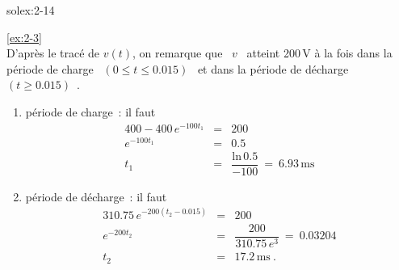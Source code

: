 \begin{exwithsol}{solex:2-14}
\begin{solexercise}{\ref{ex:2-3}}
\\
D'apr\`es le trac\'e de $ v(t)$, on remarque que \ $v$ \
atteint 200$\,$V \`a la fois dans la p\'eriode de charge \ $(0 \leq t \leq
0.015)$ \ et dans la p\'eriode de d\'echarge \ $(t \geq 0.015)$~.

\begin{enumerate}
	\item p\'eriode de charge~: il faut
	\begin{eqnarray*}
		400 - 400\, e^{-100t_1} &=& 200\\
		e^{-100t_1} &=& 0.5\\
		t_1 &=& \dfrac{ \mbox{ln}\, 0.5}{-100} \: = \: 6.93\,\mbox{ms}
	\end{eqnarray*}
	\item p\'eriode de d\'echarge~: il faut
	\begin{eqnarray*}
		310.75\, e^{-200(t_2-0.015)} &=& 200\\
		e^{-200t_2} &=& \dfrac{200}{310.75\, e^3} \: = \: 0.03204\\
		t_2 &=& 17.2\,\mbox{ms}~.
	\end{eqnarray*}
\end{enumerate}
\end{solexercise}


\end{exwithsol}
